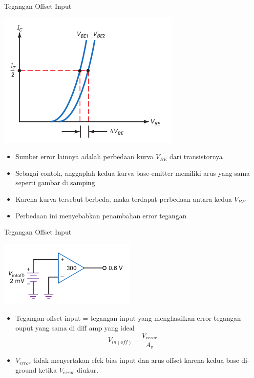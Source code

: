 \documentclass[aspectratio=169]{beamer}
\begin{document}
\begin{frame}{Tegangan Offset Input}
	\begin{multicols}{2}
		\begin{center}
			\includegraphics[height=0.7\textheight]{gambar/01.different_base-emitter_curves_added_to_error}
		\end{center}
		\columnbreak
		\begin{itemize}
			\item Sumber error lainnya adalah perbedaan kurva $ V_{BE} $ dari transistornya
			\item Sebagai contoh, anggaplah kedua kurva base-emitter memiliki arus yang sama seperti gambar di samping
			\item Karena kurva tersebut berbeda, maka terdapat perbedaan antara kedua $ V_{BE} $
			\item Perbedaan ini menyebabkan penambahan error tegangan
		\end{itemize}
	\end{multicols}
\end{frame}

\begin{frame}{Tegangan Offset Input}
	\begin{multicols}{2}
		\begin{center}
			\includegraphics[height=0.4\textheight]{gambar/01.input_offset_voltage_is_equivalent_to_an_unwanted_input_voltage}
		\end{center}
		\columnbreak
		\begin{itemize}
			\item Tegangan offset input = tegangan input yang menghasilkan error tegangan ouput yang sama di diff amp yang ideal
			\begin{equation}
				V_{in(off)} = \frac{V_{error}}{A_v}
			\end{equation}
			\item $ V_{error} $ tidak menyertakan efek bias input dan arus offset karena kedua base di-ground ketika $ V_{error} $ diukur.
		\end{itemize}
	\end{multicols}
\end{frame}
\end{document}
